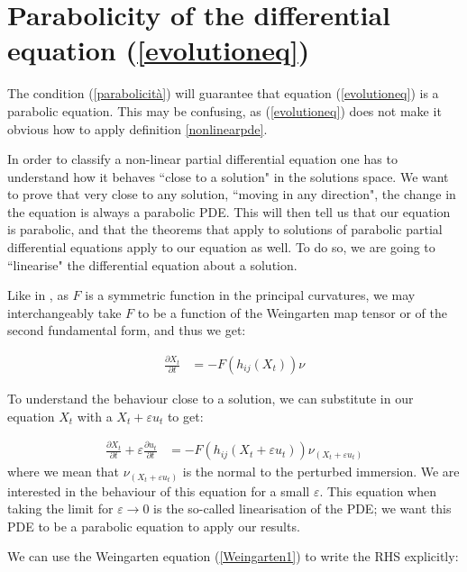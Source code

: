 \section{Parabolicity of the differential equation (\ref{evolutioneq})}\label{parabolic}


The condition (\ref{parabolicità}) will  guarantee that equation (\ref{evolutioneq}) is a parabolic equation. This may be confusing, as (\ref{evolutioneq}) does not make it obvious how to apply definition \ref{nonlinearpde}. 

In order to classify a non-linear partial differential equation one has to understand how it behaves ``close to a solution" in the solutions space. We want to prove that very close to any solution, ``moving in any direction", the change in the equation is always a parabolic PDE. This will then tell us that our equation is parabolic, and that the theorems that apply to solutions of parabolic partial differential equations apply to our equation as well. To do so, we are going to ``linearise" the differential equation about a solution.

Like in \cite{huisken}, as $F$ is a symmetric function in the principal curvatures, we may interchangeably take $F$ to be a function of the Weingarten map tensor or of the second fundamental form, and thus we get:

\begin{align*}
	\frac{\partial X_t}{\partial t} &= - F(h_{ij}(X_t)) \nu
\end{align*}

To understand the behaviour close to a solution, we can substitute in our equation $X_t$ with a $X_t+\varepsilon u_t$ to get:

\begin{align}
	\frac{\partial X_t}{\partial t} + \varepsilon\frac{\partial u_t}{\partial t}  &= - F(h_{ij}(X_t+\varepsilon u_t)) \nu_{(X_t+\varepsilon u_t)}\label{linearizingevolutioneq}
\end{align}
where we mean that  $\nu_{(X_t+\varepsilon u_t)}$ is the normal to the perturbed immersion. 
We are interested in the behaviour of this equation for a small $\varepsilon$. This equation when taking the limit for $\varepsilon \rightarrow 0$ is the so-called linearisation of the PDE; we want this PDE to be a parabolic equation to apply our results.

We can use the Weingarten equation (\ref{Weingarten1}) to write the RHS explicitly:

